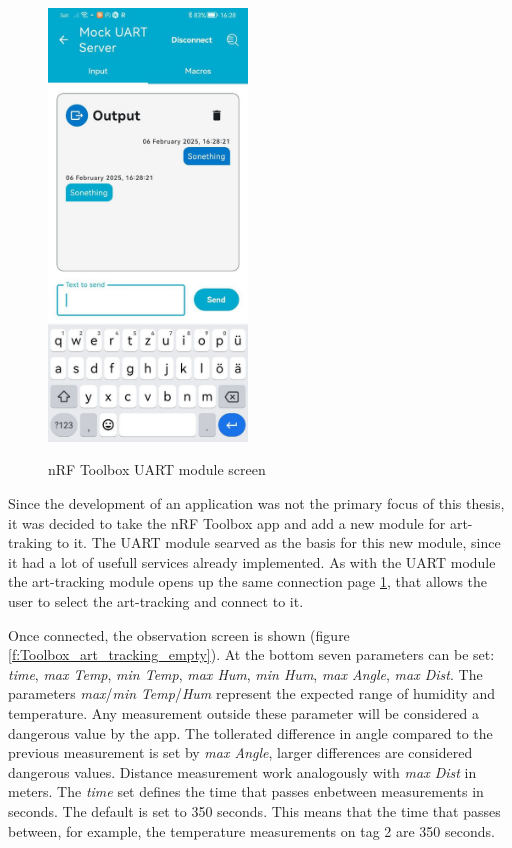\begin{figure}[ht!]
\centering
 \caption{nRF Toolbox UART module screen}
\includegraphics[width=200px]{graphics/nRF_toolbox_messanger.jpg}
\label{f:Toolbox_connect}
\end{figure}

Since the development of an application was not the primary focus of this thesis, it was decided to take the nRF Toolbox app and add a new module for art-traking to it.
The UART module searved as the basis for this new module, since it had a lot of usefull services already implemented.
As with the UART module the art-tracking module opens up the same connection page \ref{f:Toolbox_connect}, that allows the user to select the art-tracking and connect to it.

Once connected, the observation screen is shown (figure \ref{f:Toolbox_art_tracking_empty}).
At the bottom seven parameters can be set: \textit{time}, \textit{max Temp}, \textit{min Temp}, \textit{max Hum}, \textit{min Hum}, \textit{max Angle}, \textit{max Dist}.
The parameters \textit{max}/\textit{min} \textit{Temp}/\textit{Hum} represent the expected range of humidity and temperature.
Any measurement outside these parameter will be considered a dangerous value by the app.
The tollerated difference in angle compared to the previous measurement is set by \textit{max Angle}, larger differences are considered dangerous values.
Distance measurement work analogously with \textit{max Dist} in meters.
The \textit{time} set defines the time that passes enbetween measurements in seconds.
The default is set to 350 seconds.
This means that the time that passes between, for example, the temperature measurements on tag 2 are 350 seconds.


